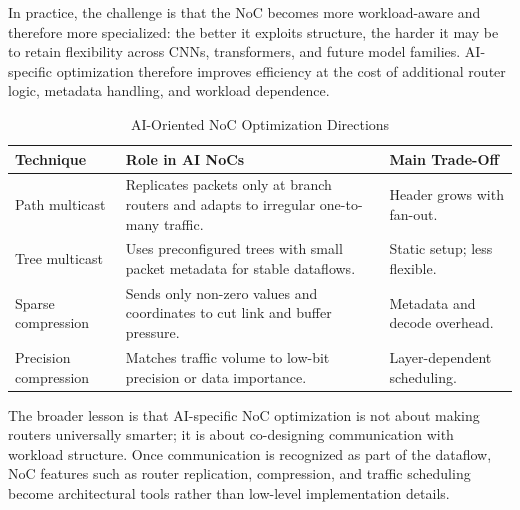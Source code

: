 In practice, the challenge is that the NoC becomes more workload-aware and therefore more specialized: the better it exploits structure, the harder it may be to retain flexibility across CNNs, transformers, and future model families. AI-specific optimization therefore improves efficiency at the cost of additional router logic, metadata handling, and workload dependence.

\begin{table}[!t]
\caption{AI-Oriented NoC Optimization Directions}
\label{tab:aiopt}
\centering
\footnotesize
\setlength{\tabcolsep}{3pt}
\renewcommand{\arraystretch}{1.08}
\begin{tabularx}{\columnwidth}{p{1.5cm}Y p{1.65cm}}
\toprule
Technique & Role in AI NoCs & Main Trade-Off \\
\midrule
Path multicast & Replicates packets only at branch routers and adapts to irregular one-to-many traffic. & Header grows with fan-out. \\
Tree multicast & Uses preconfigured trees with small packet metadata for stable dataflows. & Static setup; less flexible. \\
Sparse compression & Sends only non-zero values and coordinates to cut link and buffer pressure. & Metadata and decode overhead. \\
Precision compression & Matches traffic volume to low-bit precision or data importance. & Layer-dependent scheduling. \\
\bottomrule
\end{tabularx}
\end{table}

The broader lesson is that AI-specific NoC optimization is not about making routers universally smarter; it is about co-designing communication with workload structure. Once communication is recognized as part of the dataflow, NoC features such as router replication, compression, and traffic scheduling become architectural tools rather than low-level implementation details.
